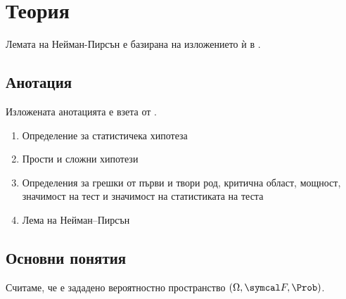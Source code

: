 \documentclass[
  numbers=endperiod,
  headings=standardclasses,
  bibliography=totocnumbered,
]{scrartcl}
\title{\Title{19}}
\subtitle{Проверка на хипотези.}
\author{Янис Василев}
\date{\Revision{28 юни 2019}}
\begin{document}
\maketitle

\section{Теория}

Лемата на Нейман-Пирсън е базирана на изложението ѝ в \cite{DimitrovYanev}.

\subsection{Анотация}

Изложената анотацията е взета от \cite{Syllabus}.

\begin{enumerate}
  \item Определение за статистичека хипотеза
  \item Прости и сложни хипотези
  \item Определения за грешки от първи и твори род, критична област, мощност, значимост на тест и значимост на статистиката на теста
  \item Лема на Нейман–Пирсън
\end{enumerate}

\subsection{Основни понятия}

Считаме, че е зададено вероятностно пространство \( (\Omega, \F, \Prob) \).
\end{document}
